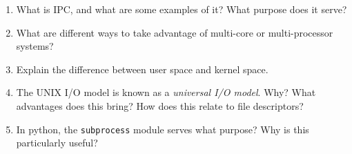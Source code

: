 \documentclass[letterpaper,10pt,onecolumn,titlepage]{article}
\begin{document}
\begin{enumerate}[itemsep=0.1 in]
\item What is IPC, and what are some examples of it? What purpose does it serve?

\item What are different ways to take advantage of multi-core or multi-processor systems?

\item Explain the difference between user space and kernel space.

\item The UNIX I/O model is known as a \emph{universal I/O model}. Why? What advantages
  does this bring? How does this relate to file descriptors?

\item\label{last} In python, the \texttt{subprocess} module serves what purpose? Why is
  this particularly useful?


\end{enumerate}

\end{document}
